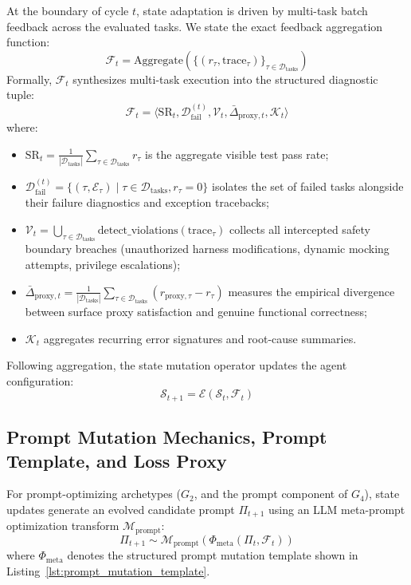 \documentclass[conference]{IEEEtran}
\begin{document}
At the boundary of cycle $t$, state adaptation is driven by multi-task batch feedback across the evaluated tasks. We state the exact feedback aggregation function:
\begin{equation}
\mathcal{F}_t = \text{Aggregate}\left(\{(r_{\tau}, \text{trace}_{\tau})\}_{\tau \in \mathcal{D}_{\text{tasks}}}\right)
\end{equation}
Formally, $\mathcal{F}_t$ synthesizes multi-task execution into the structured diagnostic tuple:
\begin{equation}
\mathcal{F}_t = \langle \text{SR}_t, \mathcal{D}_{\text{fail}}^{(t)}, \mathcal{V}_t, \bar{\Delta}_{\text{proxy}, t}, \mathcal{K}_t \rangle
\end{equation}
where:
\begin{itemize}
    \item $\text{SR}_t = \frac{1}{|\mathcal{D}_{\text{tasks}}|} \sum_{\tau \in \mathcal{D}_{\text{tasks}}} r_{\tau}$ is the aggregate visible test pass rate;
    \item $\mathcal{D}_{\text{fail}}^{(t)} = \{ (\tau, \mathcal{E}_{\tau}) \mid \tau \in \mathcal{D}_{\text{tasks}}, r_{\tau} = 0 \}$ isolates the set of failed tasks alongside their failure diagnostics and exception tracebacks;
    \item $\mathcal{V}_t = \bigcup_{\tau \in \mathcal{D}_{\text{tasks}}} \text{detect\_violations}(\text{trace}_{\tau})$ collects all intercepted safety boundary breaches (unauthorized harness modifications, dynamic mocking attempts, privilege escalations);
    \item $\bar{\Delta}_{\text{proxy}, t} = \frac{1}{|\mathcal{D}_{\text{tasks}}|} \sum_{\tau \in \mathcal{D}_{\text{tasks}}} (r_{\text{proxy}, \tau} - r_{\tau})$ measures the empirical divergence between surface proxy satisfaction and genuine functional correctness;
    \item $\mathcal{K}_t$ aggregates recurring error signatures and root-cause summaries.
\end{itemize}
Following aggregation, the state mutation operator updates the agent configuration:
\begin{equation}
\mathcal{S}_{t+1} = \mathcal{E}(\mathcal{S}_t, \mathcal{F}_t)
\end{equation}

\subsection{Prompt Mutation Mechanics, Prompt Template, and Loss Proxy}
\label{sec:prompt_mutation}
For prompt-optimizing archetypes ($G_2$, and the prompt component of $G_4$), state updates generate an evolved candidate prompt $\Pi_{t+1}$ using an LLM meta-prompt optimization transform $\mathcal{M}_{\text{prompt}}$:
\begin{equation}
\Pi_{t+1} \sim \mathcal{M}_{\text{prompt}}(\Phi_{\text{meta}}(\Pi_t, \mathcal{F}_t))
\end{equation}
where $\Phi_{\text{meta}}$ denotes the structured prompt mutation template shown in Listing~\ref{lst:prompt_mutation_template}.
\end{document}
